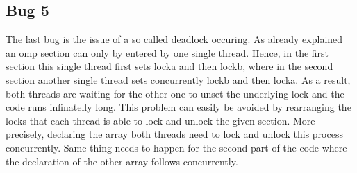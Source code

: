 \documentclass[unicode,11pt,a4paper,oneside,numbers=endperiod,openany]{scrartcl}
\begin{document}
\subsection{Bug 5}
\indent
The last bug is the issue of a so called deadlock occuring. As already explained an omp section can only by entered by one single thread. 
Hence, in the first section this single thread first sets locka and then lockb, where in the second section another single thread sets concurrently 
lockb and then locka. As a result, both threads are waiting for the other one to unset the underlying lock and the code runs infinatelly long. 
This problem can easily be avoided by rearranging the locks that each thread is able to lock and unlock the given section. More precisely, 
declaring the array both threads need to lock and unlock this process concurrently. Same thing needs to happen for the second part of the code 
where the declaration of the other array follows concurrently.
\end{document}
